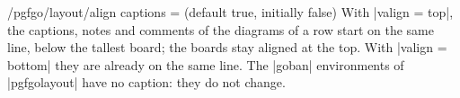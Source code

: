 \begin{key}{/pgfgo/layout/align captions =  (default true, initially false)}
	With |valign = top|, the captions, notes and comments of the diagrams of a row start on the same line, below the tallest board; the boards stay aligned at the top. With |valign = bottom| they are already on the same line. The |goban| environments of |pgfgolayout| have no caption: they do not change.

	\begin{codeexample}
	\end{codeexample}
\end{key}
